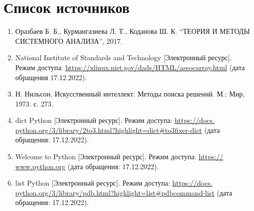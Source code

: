 %



\section*{\large Список источников}
\begin{enumerate}
	\item Оразбаев Б. Б., Курмангазиева Л. Т., Коданова Ш. К. “ТЕОРИЯ И МЕТОДЫ СИСТЕМНОГО АНАЛИЗА”, 2017. \label{bib:1}
	\item National Institute of Standards and Technology [Электронный ресурс]. \\ Режим доступа: \url{https://xlinux.nist.gov/dads/HTML/assocarray.html} (дата обращения 17.12.2022). \label{bib:2}
	\item Н. Нильсон. Искусственный интеллект. Методы поиска решений. М.: Мир, 1973. с. 273. \label{bib:3}
	\item dict Python [Электронный ресурс]. Режим доступа: \url{https://docs. python.org/3/library/2to3.html?highlight=dict#to3fixer-dict} (дата обращения: 17.12.2022).\label{bib:4}
	\item Welcome to Python [Электронный ресурс]. Режим доступа: \url{https:// www.python.org} (дата обращения: 17.12.2022). \label{bib:5}
	\item  list Python [Электронный ресурс]. Режим доступа: \url{https://docs. python.org/3/library/pdb.html?highlight=list#pdbcommand-list} (дата обращения: 17.12.2022). \label{bib:6}
\end{enumerate}